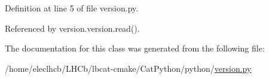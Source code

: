 Definition at line 5 of file version.\+py.



Referenced by version.\+version.\+read().



The documentation for this class was generated from the following file\+:\begin{DoxyCompactItemize}
\item 
/home/eleclhcb/\+L\+H\+Cb/lbcat-\/cmake/\+Cat\+Python/python/\hyperlink{version_8py}{version.\+py}\end{DoxyCompactItemize}
